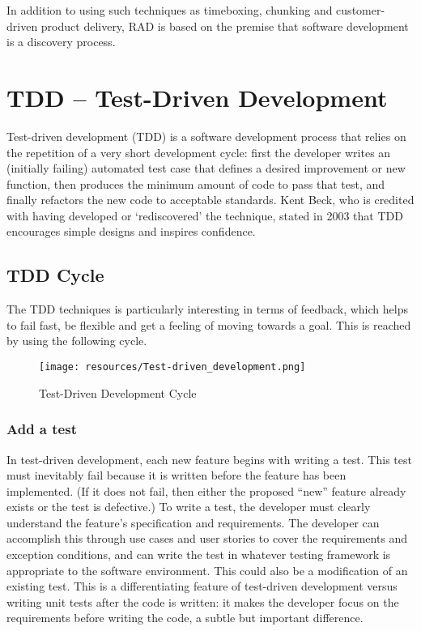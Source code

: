 In addition to using such techniques as timeboxing, chunking and customer-driven product delivery, RAD is based on the premise that software development is a discovery process.


\section{TDD -- Test-Driven Development}

Test-driven development (TDD) is a software development process that relies on the repetition of a very short development cycle: first the developer writes an (initially failing) automated test case that defines a desired improvement or new function, then produces the minimum amount of code to pass that test, and finally refactors the new code to acceptable standards. Kent Beck, who is credited with having developed or `rediscovered' the technique, stated in 2003 that TDD encourages simple designs and inspires confidence.

\subsection{TDD Cycle}

The TDD techniques is particularly interesting in terms of feedback, which helps to fail fast, be flexible and get a feeling of moving towards a goal. This is reached by using the following cycle.

\begin{figure}
	\centering
	\texttt{[image: resources/Test-driven\_development.png]}
	\caption[Test-Driven Development Cycle]{Test-Driven Development Cycle}
\end{figure}

\subsubsection{Add a test}

In test-driven development, each new feature begins with writing a test. This test must inevitably fail because it is written before the feature has been implemented. (If it does not fail, then either the proposed ``new'' feature already exists or the test is defective.) To write a test, the developer must clearly understand the feature's specification and requirements. The developer can accomplish this through use cases and user stories to cover the requirements and exception conditions, and can write the test in whatever testing framework is appropriate to the software environment. This could also be a modification of an existing test. This is a differentiating feature of test-driven development versus writing unit tests after the code is written: it makes the developer focus on the requirements before writing the code, a subtle but important difference.

